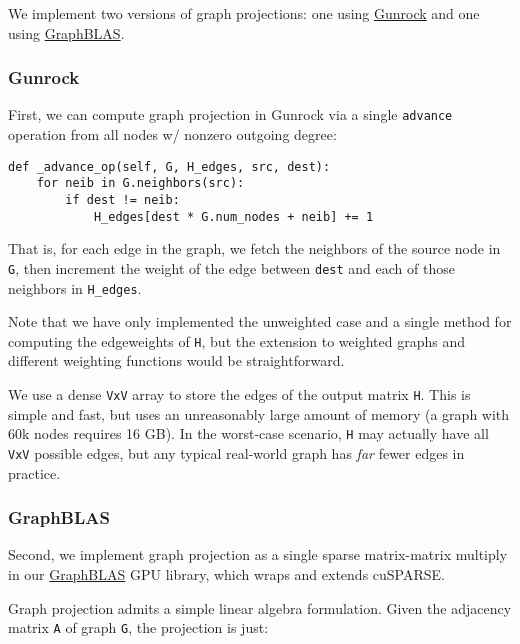 \documentclass[10pt,oneside]{memoir}
\begin{document}
We implement two versions of graph projections: one using
\href{https://github.com/gunrock/gunrock}{Gunrock} and one using
\href{https://github.com/owensgroup/GraphBLAS}{GraphBLAS}.

\hypertarget{gunrock}{%
\subsubsection{Gunrock}\label{gunrock}}

First, we can compute graph projection in Gunrock via a single
\texttt{advance} operation from all nodes w/ nonzero outgoing degree:

\begin{verbatim}
def _advance_op(self, G, H_edges, src, dest):
    for neib in G.neighbors(src):
        if dest != neib:
            H_edges[dest * G.num_nodes + neib] += 1
\end{verbatim}

That is, for each edge in the graph, we fetch the neighbors of the
source node in \texttt{G}, then increment the weight of the edge between
\texttt{dest} and each of those neighbors in \texttt{H\_edges}.

Note that we have only implemented the unweighted case and a single
method for computing the edgeweights of \texttt{H}, but the extension to
weighted graphs and different weighting functions would be
straightforward.

We use a dense \texttt{\textbar{}V\textbar{}x\textbar{}V\textbar{}}
array to store the edges of the output matrix \texttt{H}. This is simple
and fast, but uses an unreasonably large amount of memory (a graph with
60k nodes requires 16 GB). In the worst-case scenario, \texttt{H} may
actually have all \texttt{\textbar{}V\textbar{}x\textbar{}V\textbar{}}
possible edges, but any typical real-world graph has \emph{far} fewer
edges in practice.

\hypertarget{graphblas}{%
\subsubsection{GraphBLAS}\label{graphblas}}

Second, we implement graph projection as a single sparse matrix-matrix
multiply in our
\href{https://github.com/owensgroup/GraphBLAS}{GraphBLAS} GPU library,
which wraps and extends cuSPARSE.

Graph projection admits a simple linear algebra formulation. Given the
adjacency matrix \texttt{A} of graph \texttt{G}, the projection is just:
\end{document}
